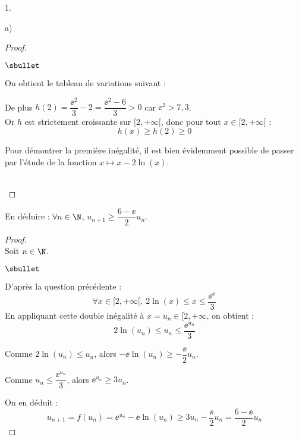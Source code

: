 \begin{noliste}{1.}
\begin{noliste}{a)}
\begin{proof}
\begin{noliste}{$\sbullet$}
        \newpage


        \noindent
        On obtient le tableau de variations suivant :        

        \begin{center}
        \end{center}
        
        De plus $h(2)=\dfrac{\ee^2}{3}-2=\dfrac{\ee^2-6}{3}>0$ car
        $\ee^2>7,3$.\\
        Or $h$ est strictement croissante sur $[2,+\infty[$, donc pour
        tout $x\in[2,+\infty[$ : 
        \[
        h(x) \geq h(2) \geq 0
        \]
      \end{noliste}
      \conc{On en conclut : $\forall x\in[2,+\infty[$, $x \leq
        \dfrac{\ee^x}{3}$.}
      
      \begin{remark}
        Pour démontrer la première inégalité, il est bien évidemment
        possible de passer par l'étude de la fonction $x\mapsto
        x-2\ln(x)$.
      \end{remark}~\\[-1.4cm]
    \end{proof}
    
  \item En déduire : $\forall n\in\N$, $u_{n+1} \geq
    \dfrac{6-\ee}{2}u_n$.
	
    \begin{proof}~\\
      Soit $n\in\N$. 
      \begin{noliste}{$\sbullet$}
      \item D'après la question précédente :
        \[
        \forall x\in[2,+\infty[, \ 2 \ln(x) \leq x \leq \dfrac{\ee^x}{3}
        \]
        En appliquant cette double inégalité à $x = u_n \in [2,
        +\infty$, on obtient :
        \[
        2\ln(u_n) \leq u_n \leq \dfrac{\ee^{u_n}}{3}
        \]

      \item Comme $2\ln(u_n) \leq u_n$, alors $-\ee \ln(u_n) \geq
        -\dfrac{\ee}{2}u_n$.
        
      \item Comme $u_n \leq \dfrac{\ee^{u_n}}{3}$, alors
        $\ee^{u_n}\geq 3u_n$.
      \end{noliste}
      On en déduit :
      \[
      u_{n+1} = f(u_n) = \ee^{u_n} - \ee \ln(u_n) \geq 3 u_n
      -\dfrac{\ee}{2} u_n = \dfrac{6-\ee}{2}u_n
      \]
    \end{proof}
    


\end{noliste}
\end{noliste}
